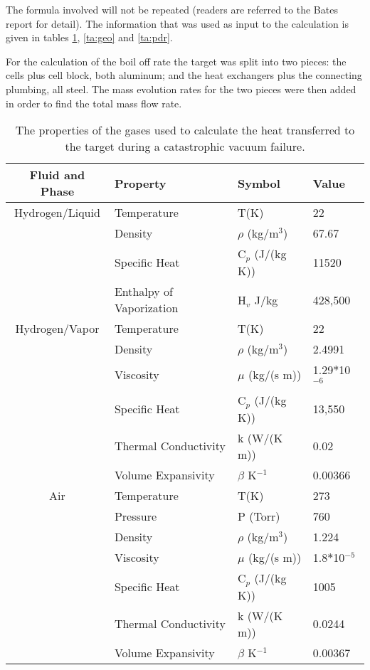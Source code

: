 The formula involved will not be repeated (readers are referred to 
the Bates report for detail).
The information that was used as input
to the calculation is given in tables \ref{ta:gas}, \ref{ta:geo}
and \ref{ta:pdr}.

For the calculation of the boil off rate the target was split into
two pieces: the cells plus cell block, both aluminum; and the heat exchangers
plus the connecting plumbing, all steel. The mass evolution rates
for the two pieces were then added in order to find the total
mass flow rate.

\begin{table}[htb]
\begin{center}
\begin{tabular}{|c|l|l|l|} \hline
Fluid and Phase & Property & Symbol & Value \\ \hline
Hydrogen/Liquid & Temperature & T(K) & 22 \\ \hline
 & Density & $\rho$ (kg/m$^3$) & 67.67 \\ \hline
 & Specific Heat & C$_p$ (J/(kg K)) & 11520 \\ \hline
 & Enthalpy of Vaporization & H$_v$ J/kg & 428,500 \\ \hline
Hydrogen/Vapor & Temperature & T(K) & 22 \\ \hline
 & Density & $\rho$ (kg/m$^3$) & 2.4991 \\ \hline
 & Viscosity & $\mu$ (kg/(s m)) & 1.29$*$10$^{-6}$ \\ \hline
 & Specific Heat & C$_p$ (J/(kg K)) & 13,550 \\ \hline
 & Thermal Conductivity & k (W/(K m)) & 0.02 \\ \hline
 & Volume Expansivity & $\beta$ K$^{-1}$ & 0.00366 \\ \hline
Air & Temperature & T(K) & 273 \\ \hline
 & Pressure & P (Torr) & 760 \\ \hline
 & Density & $\rho$ (kg/m$^3$) & 1.224 \\ \hline
 & Viscosity & $\mu$ (kg/(s m)) & 1.8$*$10$^{-5}$ \\ \hline
 & Specific Heat & C$_p$ (J/(kg K)) & 1005 \\ \hline
 & Thermal Conductivity & k (W/(K m)) & 0.0244 \\ \hline
 & Volume Expansivity & $\beta$ K$^{-1}$ & 0.00367 \\ \hline
\end{tabular}
\end{center}
\caption[Cryotarget: Gas Properties]{ The properties of the gases used to calculate
the heat transferred to the target during a catastrophic vacuum failure.}
\label{ta:gas}
\end{table}

